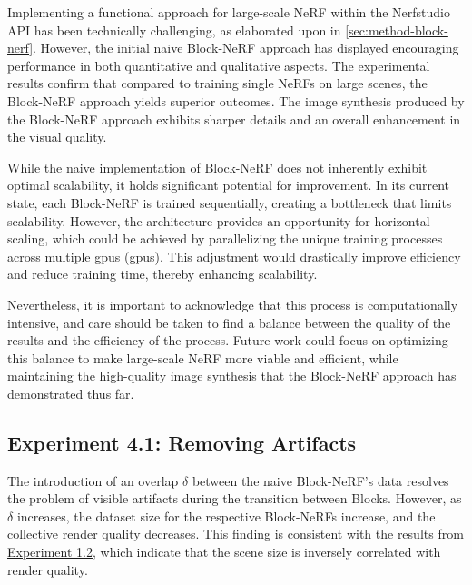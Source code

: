 Implementing a functional approach for large-scale NeRF within the Nerfstudio API has been technically challenging, as elaborated upon in \autoref{sec:method-block-nerf}. However, the initial naive Block-NeRF approach has displayed encouraging performance in both quantitative and qualitative aspects. The experimental results confirm that compared to training single NeRFs on large scenes, the Block-NeRF approach yields superior outcomes. The image synthesis produced by the Block-NeRF approach exhibits sharper details and an overall enhancement in the visual quality.

While the naive implementation of Block-NeRF does not inherently exhibit optimal scalability, it holds significant potential for improvement. In its current state, each Block-NeRF is trained sequentially, creating a bottleneck that limits scalability. However, the architecture provides an opportunity for horizontal scaling, which could be achieved by parallelizing the unique training processes across multiple \acrlong{gpu}s (\acrshort{gpu}s). This adjustment would drastically improve efficiency and reduce training time, thereby enhancing scalability.

Nevertheless, it is important to acknowledge that this process is computationally intensive, and care should be taken to find a balance between the quality of the results and the efficiency of the process. Future work could focus on optimizing this balance to make large-scale NeRF more viable and efficient, while maintaining the high-quality image synthesis that the Block-NeRF approach has demonstrated thus far.





\subsection{Experiment 4.1: Removing Artifacts}

The introduction of an overlap $\delta$ between the naive Block-NeRF's data resolves the problem of visible artifacts during the transition between Blocks. However, as $\delta$ increases, the dataset size for the respective Block-NeRFs increase, and the collective render quality decreases. This finding is consistent with the results from \hyperref[sec:exp-capacity]{Experiment 1.2}, which indicate that the scene size is inversely correlated with render quality.

